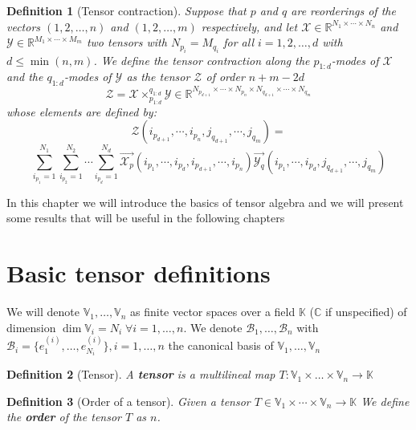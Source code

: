 \documentclass[11pt,a4paper,openright,oneside]{book}
\numberwithin{equation}{section}
\newtheorem{defn0}{Definition}[chapter]
\newenvironment{definition}{ \begin{defn0}}{\end{defn0}}
\begin{document}
\begin{definition}[Tensor contraction]
     Suppose that $p$ and $q$ are reorderings of the vectors
    $(1,2,\dots,n)$ and $(1,2,\dots,m)$ respectively, and let ${\mathcal{X} \in \mathbb{R}^{N_1 \times \cdots \times N_n}}$ 
    and $\mathcal{Y} \in \mathbb{R}^{M_1 \times \cdots \times M_m}$ two tensors with $N_{p_i} = M_{q_i}$ for all $i = 1,2,\dots,d$
    with $d \leqslant \min{(n, m)}$. We define the tensor contraction along the $p_{1:d}$-modes of $\mathcal{X}$ and the $q_{1:d}$-modes
    of $\mathcal{Y}$ as the tensor $\mathcal{Z}$ of order $n + m - 2d$
$$\mathcal{Z} = \mathcal{X} \times_{p_{1:d}}^{q_{1:d}} \mathcal{Y} \in \mathbb{R}^{N_{p_{d+1}} \times \cdots \times N_{p_{n}} \times N_{q_{d+1}} \times \cdots \times N_{q_m}}$$
whose elements are defined by:
$$\mathcal{Z}(i_{p_{d+1}}, \cdots, i_{p_n}, j_{q_{d+1}}, \cdots, j_{q_m}) = $$$$ \sum_{i_{p_1} = 1}^{N_1} \sum_{i_{p_2} = 1}^{N_2} \cdots \sum_{i_{p_d} = 1}^{N_d}
\overrightarrow{\mathcal{X}_p}(i_{p_1}, \cdots, i_{p_d}, i_{p_{d+1}}, \cdots, i_{p_n}) \overrightarrow{\mathcal{Y}_q}(i_{p_1}, \cdots, i_{p_d}, j_{q_{d+1}}, \cdots, j_{q_m})$$
\end{definition}



\fi




In this chapter we will introduce the basics of tensor algebra and we will present some results that will be useful in the
following chapters

\section{Basic tensor definitions}

We will denote $\mathbb{V}_1, \dots, \mathbb{V}_n$ as finite vector spaces over a field $\mathbb{K}$ ($\mathbb{C}$ if unspecified) of dimension $\dim{\mathbb{V}_i} = N_i \; \forall i = 1, \dots, n$.
We denote $\mathcal{B}_1, \dots, \mathcal{B}_n$ with ${\mathcal{B}_i = \{e_1^{(i)}, \dots, e_{N_i}^{(i)}\}, i = 1, \dots, n}$ the canonical basis of $\mathbb{V}_1, \dots, \mathbb{V}_n$

\begin{definition}[Tensor]
    A \textbf{tensor} is a multilineal map ${T: \mathbb{V}_1 \times \dots \times \mathbb{V}_n \rightarrow \mathbb{K}}$
\end{definition}

\begin{definition}[Order of a tensor] Given a tensor $T \in \mathbb{V}_1 \times \cdots \times \mathbb{V}_n \rightarrow \mathbb{K}$ We define the \textbf{order} of the tensor $T$ as $n$.
\end{definition}
\end{document}
